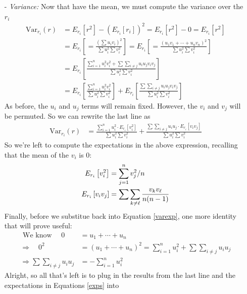 \documentclass[a4paper,12pt]{scrartcl}
\begin{document}
\begin{itemize}
   \item[-] {\sl Variance:} Now that have the mean, we must compute
     the variance over the $r_i$
      \begin{align*}
	 \text{Var}_{r_i}(r) &= E_{r_i}[r^2] - (E_{r_i}[r_i])^2 =
	 E_{r_i}[r^2] - 0
	 = E_{r_i}[r^2]\\
	 &= E_{r_i} \left[
	     = \frac{\left(\sum u_i v_i\right)^2}{\sum u^2_i\sum v^2_i}
	     \right] = E_{r_i} \left[
	     = \frac{\left(u_1 v_1+ \cdots + u_n v_n \right)^2}{
	     \sum u^2_i \sum v^2_i} \right] \\
	 &=E_{r_i} \left[\frac{\sum_{i=1}^n u^2_i v^2_i + \sum
	       \sum_{i\neq j}
		u_i u_j v_i v_j}{\sum u^2_i \sum v^2_i} \right] \\
	 &=E_{r_i} \left[\frac{\sum_{i=1}^n u^2_i v^2_i}{
	    \sum u^2_i \sum v^2_i} \right] +
	  E_{r_i} \left[\frac{\sum \sum_{i\neq j}
	     u_i u_j v_i v_j}{\sum u^2_i \sum v^2_i} \right]
      \end{align*}
      As before, the $u_i$ and $u_j$ terms will remain fixed. However,
      the $v_i$ and $v_j$ will be permuted. So we can rewrite the last
      line as
      \begin{align}
	 \label{varexp}
	 \text{Var}_{r_i}(r) &= \frac{\sum_{i=1}^n u^2_i \cdot E_{r_i}
	    \left[v^2_i\right]}{
	    \sum u^2_i \sum v^2_i} +
	  \frac{\sum \sum_{i\neq j} u_i u_j\cdot E_{r_i}
	    \left[v_i v_j\right] }{\sum u^2_i \sum v^2_i}
      \end{align}
      So we're left to compute the expectations in the above expression,
      recalling that the mean of the $v_i$ is 0:
      \begin{align}
	 \label{exps}
	 E_{r_i} \left[v^2_i\right] &= \sum^n_{j=1} v_j^2 /n\notag\\
	 E_{r_i}\left[v_i v_j\right] &= \sum \sum_{k\neq \ell} \frac{
	 v_k v_\ell}{n(n-1)}
      \end{align}
      Finally, before we substitue back into Equation \ref{varexp},
      one more identity that will prove useful:
      \begin{align*}
	 \text{ We know } \quad 0 &= u_1 + \cdots + u_n \\
	 \Rightarrow \quad 0^2 &= (u_1 + \cdots + u_n)^2 =
	 \sum_{i=1}^n u_i^2 + \sum \sum_{i\neq j} u_i u_j\\
	 \Rightarrow \sum \sum_{i\neq j} u_i u_j &=-\sum_{i=1}^n u_i^2
      \end{align*}
      Alright, so all that's left is to plug in the results from
      the last line and the expectations in Equations \ref{exps} into

\end{itemize}
\end{document}
